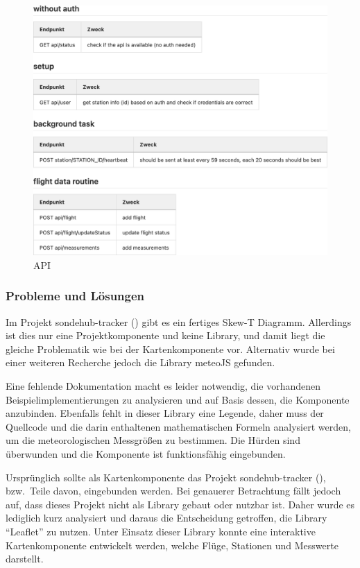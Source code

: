 \begin{figure}[h!]
    \centering
    \caption{API}
    \label{fig:api}
    \includegraphics[scale=0.55]{assets/api}
\end{figure}
\newpage

\subsubsection{Probleme und Lösungen}

Im Projekt sondehub-tracker (\cite{sondehub-tracker}) gibt es ein fertiges Skew-T Diagramm.
Allerdings ist dies nur eine Projektkomponente und keine Library, und damit liegt die gleiche Problematik wie bei der Kartenkomponente vor.
Alternativ wurde bei einer weiteren Recherche jedoch die Library meteoJS gefunden.

Eine fehlende Dokumentation macht es leider notwendig, die vorhandenen Beispielimplementierungen zu analysieren und auf Basis dessen, die Komponente anzubinden.
Ebenfalls fehlt in dieser Library eine Legende, daher muss der Quellcode und die darin enthaltenen mathematischen Formeln analysiert werden, um die meteorologischen Messgrößen zu bestimmen.
Die Hürden sind überwunden und die Komponente ist funktionsfähig eingebunden.

Ursprünglich sollte als Kartenkomponente das Projekt sondehub-tracker (\cite{sondehub-tracker}), bzw.\ Teile davon, eingebunden werden.
Bei genauerer Betrachtung fällt jedoch auf, dass dieses Projekt nicht als Library gebaut oder nutzbar ist.
Daher wurde es lediglich kurz analysiert und daraus die Entscheidung getroffen, die Library \enquote{Leaflet} zu nutzen.
Unter Einsatz dieser Library konnte eine interaktive Kartenkomponente entwickelt werden, welche Flüge, Stationen und Messwerte darstellt.

